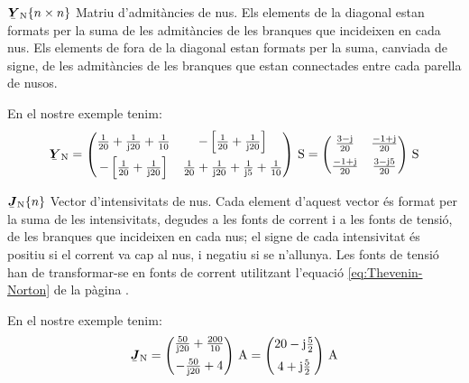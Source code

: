 \begin{list}{}
   {\setlength{\labelwidth}{20mm} \setlength{\leftmargin}{22mm} \setlength{\labelsep}{2mm}}

   \item[$\mcmplx{Y}\ped{N}\{n \times n\}$] Matriu d'admitàncies de nus. Els elements de la diagonal estan formats per la suma de les admitàncies de les branques que incideixen en cada nus.
   Els elements de fora de la diagonal estan formats per la suma, canviada de signe, de les admitàncies de les branques que estan connectades entre cada parella de nusos.

   En el nostre exemple tenim:
   \[
      \mcmplx{Y}\ped{N} =
      \begin{pmatrix}
            \frac{1}{20} + \frac{1}{\ju 20} +  \frac{1}{10} &
            -\left[\frac{1}{20} + \frac{1}{\ju 20}\right] \\[2mm]
            -\left[\frac{1}{20} + \frac{1}{\ju 20}\right]  &
            \frac{1}{20} + \frac{1}{\ju 20} +  \frac{1}{\ju 5} + \frac{1}{10}
      \end{pmatrix}\unit{\,S} =
      \begin{pmatrix}
            \frac{3 - \ju}{20}  & \frac{-1 + \ju}{20} \\[2mm]
            \frac{-1 + \ju}{20} & \frac{3 - \ju 5}{20}
      \end{pmatrix}\unit{\,S}
   \]

   \item[$\mcmplx{J}\ped{N}\{n\}$] Vector
d'intensivitats de nus. Cada element d'aquest vector és format per la suma de
les intensivitats, degudes a les fonts de corrent i a les fonts de tensió, de les
branques que incideixen en cada nus; el signe de cada intensivitat és positiu si el
corrent va cap al nus, i negatiu si se n'allunya. Les fonts de tensió han de
transformar-se en fonts de corrent utilitzant l'equació \eqref{eq:Thevenin-Norton} de
la pàgina \pageref{eq:Thevenin-Norton}.

   En el nostre exemple tenim:
   \[
      \mcmplx{J}\ped{N} =
      \begin{pmatrix}
            \frac{50}{\ju 20} +  \frac{200}{10} \\[2mm]
            - \frac{50}{\ju 20} + 4
      \end{pmatrix}\unit{\,A} =
      \begin{pmatrix}
            20 - \ju \frac{5}{2} \\[2mm]
            4 + \ju \frac{5}{2}
      \end{pmatrix}\unit{\,A}
   \]

\end{list}

